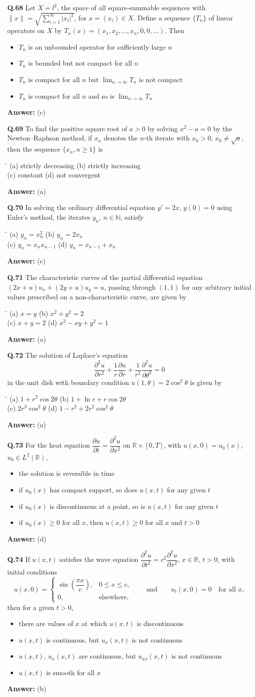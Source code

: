 \documentclass[11pt,a4paper]{article}
\newcommand{\optsfour}[4]{%
  \begin{tabbing}
    \hspace{0.48\linewidth}\=\kill
    (a) #1 \> (b) #2 \\[2pt]
    (c) #3 \> (d) #4
  \end{tabbing}%
}
\newcommand{\optslist}[4]{%
  \begin{itemize}
    \setlength{\itemsep}{2pt}\setlength{\parskip}{0pt}
    \item[(a)] #1
    \item[(b)] #2
    \item[(c)] #3
    \item[(d)] #4
  \end{itemize}%
}
\newcommand{\ans}[1]{\textbf{Answer:} #1\par\medskip}
\begin{document}
\textbf{Q.68} Let $X = l^2$, the space of all square-summable sequences with $\|x\| = \sqrt{\sum_{i=1}^{\infty} |x_i|^2}$, for $x = (x_i) \in X$. Define a sequence $\{T_n\}$ of linear operators on $X$ by $T_n(x) = (x_1, x_2, \dots, x_n, 0, 0, \dots)$. Then
\optslist{$T_n$ is an unbounded operator for sufficiently large $n$}{$T_n$ is bounded but not compact for all $n$}{$T_n$ is compact for all $n$ but $\lim_{n\to\infty} T_n$ is not compact}{$T_n$ is compact for all $n$ and so is $\lim_{n\to\infty} T_n$}
\ans{(c)}

\textbf{Q.69} To find the positive square root of $a > 0$ by solving $x^2 - a = 0$ by the Newton--Raphson method, if $x_n$ denotes the $n$-th iterate with $x_0 > 0$, $x_0 \ne \sqrt{a}$, then the sequence $\{x_n, n \ge 1\}$ is
\optsfour{strictly decreasing}{strictly increasing}{constant}{not convergent}
\ans{(a)}

\textbf{Q.70} In solving the ordinary differential equation $y' = 2x$, $y(0) = 0$ using Euler's method, the iterates $y_n$, $n \in \mathbb{N}$, satisfy
\optsfour{$y_n = x_n^2$}{$y_n = 2x_n$}{$y_n = x_n x_{n-1}$}{$y_n = x_{n-1} + x_n$}
\ans{(c)}

\textbf{Q.71} The characteristic curves of the partial differential equation $(2x + u)u_x + (2y + u)u_y = u$, passing through $(1, 1)$ for any arbitrary initial values prescribed on a non-characteristic curve, are given by
\optsfour{$x = y$}{$x^2 + y^2 = 2$}{$x + y = 2$}{$x^2 - xy + y^2 = 1$}
\ans{(a)}

\textbf{Q.72} The solution of Laplace's equation
\[
  \frac{\partial^2 u}{\partial r^2} + \frac{1}{r}\frac{\partial u}{\partial r} + \frac{1}{r^2}\frac{\partial^2 u}{\partial \theta^2} = 0
\]
in the unit disk with boundary condition $u(1, \theta) = 2\cos^2\theta$ is given by
\optsfour{$1 + r^2\cos 2\theta$}{$1 + \ln r + r\cos 2\theta$}{$2r^3\cos^2\theta$}{$1 - r^2 + 2r^2\cos^2\theta$}
\ans{(a)}

\textbf{Q.73} For the heat equation $\dfrac{\partial u}{\partial t} = \dfrac{\partial^2 u}{\partial x^2}$ on $\mathbb{R} \times [0, T]$, with $u(x,0) = u_0(x)$, $u_0 \in L^2(\mathbb{R})$,
\optslist{the solution is reversible in time}{if $u_0(x)$ has compact support, so does $u(x, t)$ for any given $t$}{if $u_0(x)$ is discontinuous at a point, so is $u(x, t)$ for any given $t$}{if $u_0(x) \ge 0$ for all $x$, then $u(x, t) \ge 0$ for all $x$ and $t > 0$}
\ans{(d)}

\textbf{Q.74} If $u(x,t)$ satisfies the wave equation $\dfrac{\partial^2 u}{\partial t^2} = c^2\dfrac{\partial^2 u}{\partial x^2}$, $x \in \mathbb{R}$, $t > 0$, with initial conditions
\[
  u(x, 0) = \begin{cases} \sin\!\left(\dfrac{\pi x}{c}\right), & 0 \le x \le c, \\ 0, & \text{elsewhere,} \end{cases}
  \qquad \text{and} \qquad u_t(x, 0) = 0 \quad \text{for all } x,
\]
then for a given $t > 0$,
\optslist{there are values of $x$ at which $u(x,t)$ is discontinuous}{$u(x,t)$ is continuous, but $u_x(x,t)$ is not continuous}{$u(x,t)$, $u_x(x,t)$ are continuous, but $u_{xx}(x,t)$ is not continuous}{$u(x,t)$ is smooth for all $x$}
\ans{(b)}
\end{document}
